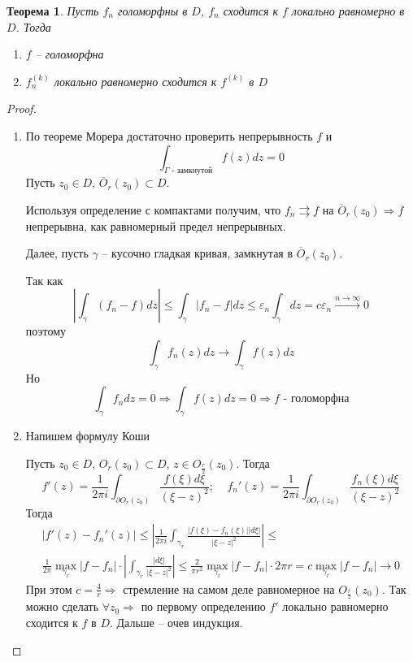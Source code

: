 \documentclass[a4paper,12pt]{article}
\renewcommand{\leq}{\ensuremath{\leqslant}}
\theoremstyle{plain}
\newtheorem{theorem}{Теорема}[section]
\theoremstyle{definition}
\theoremstyle{remark}
\begin{document}
\begin{theorem}
	Пусть $f_n$ голоморфны в $D$, $f_n$ сходится к $f$ локально равномерно в $D$. Тогда
	\begin{enumerate}
		\item $f$ -- голоморфна
		\item $f_n^{(k)}$ локально равномерно сходится к $f^{(k)}$ в $D$
	\end{enumerate}
\end{theorem}

\begin{proof}
	\begin{enumerate}
		\item По теореме Морера достаточно проверить непрерывность $f$ и 
		\[
			\int_{\Gamma \text{ - замкнутой}}f(z)dz = 0 
		\]
		Пусть $z_0 \in D,\, \overline{O}_r(z_0) \subset D$. 

		Используя определение с компактами получим, что $f_n \rightrightarrows f$ на $\overline{O}_r(z_0) \Rightarrow f$ непрерывна, как равномерный предел непрерывных.
		
		Далее, пусть $\gamma$ -- кусочно гладкая кривая, замкнутая в $\overline{O}_r(z_0)$. 

		Так как
		\[
			\left\vert\int_\gamma (f_n - f)dz\right\vert \leq \int_\gamma\vert f_n - f\vert dz \leq \varepsilon_n\int_\gamma dz = c\varepsilon_n \overset{n \to \infty}{\to} 0
		\]
		поэтому
		\[
			\int_\gamma f_n(z)dz \to \int_\gamma f(z)dz 
		\]
		Но 
		\[
			\int_\gamma f_ndz = 0 \Rightarrow \int_\gamma f(z)dz = 0 \Rightarrow f \text{ - голоморфна}
		\]
		\item Напишем формулу Коши
		
		Пусть $z_0 \in D,\, O_r(z_0) \subset D,\, z \in O_{\frac{r}{2}}(z_0)$. Тогда
		\[
			f'(z) = \frac{1}{2\pi i} \int_{\partial O_r(z_0)}\frac{f(\xi)d\xi}{(\xi - z)^2};\;\;\;\; f_n'(z) = \frac{1}{2\pi i}\int_{\partial O_r(z_0)}\frac{f_n(\xi)d\xi}{(\xi - z)^2}
		\]
		Тогда
		\begin{align*}
			\vert f'(z) - f_n'(z)\vert \leq \left\vert\frac{1}{2\pi i}\int_{\gamma_r}\frac{\vert f(\xi) - f_n(\xi)\vert\vert d\xi\vert}{\vert \xi - z\vert^2}\right\vert \leq\\ 
			\frac{1}{2\pi}\max_{\gamma_r}\vert f- f_n\vert\cdot\left\vert\int_{\gamma_r}\frac{\vert d\xi\vert}{\vert \xi - z\vert^2}\right\vert \leq \frac{2}{\pi r^2}\max_{\gamma_r}\vert f - f_n\vert\cdot2\pi r = c\max_{\gamma_r}\vert f - f_n\vert \to 0
		\end{align*}
		При этом $c = \frac{4}{r} \Rightarrow$ стремление на самом деле равномерное на $O_{\frac{r}{2}}(z_0)$. Так можно сделать $\forall z_0 \Rightarrow$ по первому определению $f'$ локально равномерно сходится к $f$ в $D$. Дальше -- очев индукция.
	\end{enumerate}
\end{proof}
\end{document}
